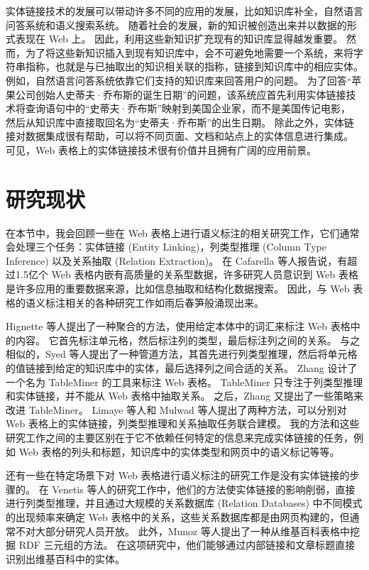 实体链接技术的发展可以带动许多不同的应用的发展，比如知识库补全，自然语言问答系统和语义搜索系统。
随着社会的发展，新的知识被创造出来并以数据的形式表现在 Web 上。
因此，利用这些新知识扩充现有的知识库显得越发重要。
然而，为了将这些新知识插入到现有知识库中，会不可避免地需要一个系统，来将字符串指称，也就是与已抽取出的知识相关联的指称，链接到知识库中的相应实体。
例如，自然语言问答系统依靠它们支持的知识库来回答用户的问题。
为了回答``苹果公司创始人史蒂夫·乔布斯的诞生日期''的问题，该系统应首先利用实体链接技术将查询语句中的``史蒂夫·乔布斯''映射到美国企业家，而不是美国传记电影，
然后从知识库中直接取回名为``史蒂夫·乔布斯''的出生日期。
除此之外，实体链接对数据集成很有帮助，可以将不同页面、文档和站点上的实体信息进行集成。
可见，Web 表格上的实体链接技术很有价值并且拥有广阔的应用前景。\par


\section{研究现状}

在本节中，我会回顾一些在 Web 表格上进行语义标注的相关研究工作，它们通常会处理三个任务：实体链接 (Entity Linking)，列类型推理 (Column Type Inference) 以及关系抽取 (Relation Extraction)。 
在 Cafarella 等人\cite{cafarella2008webtables}报告说，有超过1.5亿个 Web 表格内嵌有高质量的关系型数据，许多研究人员意识到 Web 表格是许多应用的重要数据来源，比如信息抽取和结构化数据搜索。 
因此，与 Web 表格的语义标注相关的各种研究工作如雨后春笋般涌现出来。\par

Hignette 等人\cite{hignette2009fuzzy}提出了一种聚合的方法，使用给定本体中的词汇来标注 Web 表格中的内容。
它首先标注单元格，然后标注列的类型，最后标注列之间的关系。
与之相似的，Syed 等人\cite{syed2010exploiting}提出了一种管道方法，其首先进行列类型推理，然后将单元格的值链接到给定的知识库中的实体，最后选择列之间合适的关系。
Zhang \cite{zhang2014towards}设计了一个名为 TableMiner 的工具来标注 Web 表格。
TableMiner 只专注于列类型推理和实体链接，并不能从 Web 表格中抽取关系。
之后，Zhang \cite{zhang2014learning}又提出了一些策略来改进 TableMiner。 
Limaye 等人\cite{limaye2010annotating}和 Mulwad 等人\cite{mulwad2013semantic}提出了两种方法，可以分别对 Web 表格上的实体链接，列类型推理和关系抽取任务联合建模。
我的方法和这些研究工作之间的主要区别在于它不依赖任何特定的信息来完成实体链接的任务，例如 Web 表格的列头和标题，知识库中的实体类型和网页中的语义标记等等。\par

还有一些在特定场景下对 Web 表格进行语义标注的研究工作是没有实体链接的步骤的。
在 Venetis 等人\cite{venetis2011recovering}的研究工作中，他们的方法使实体链接的影响削弱，直接进行列类型推理，并且通过大规模的关系数据库 (Relation Databases) 中不同模式的出现频率来确定 Web 表格中的关系，这些关系数据库都是由网页构建的，但通常不对大部分研究人员开放。
此外，Munoz 等人\cite{munoz2014using}提出了一种从维基百科表格中挖掘 RDF 三元组的方法。
在这项研究中，他们能够通过内部链接和文章标题直接识别出维基百科中的实体。\par

